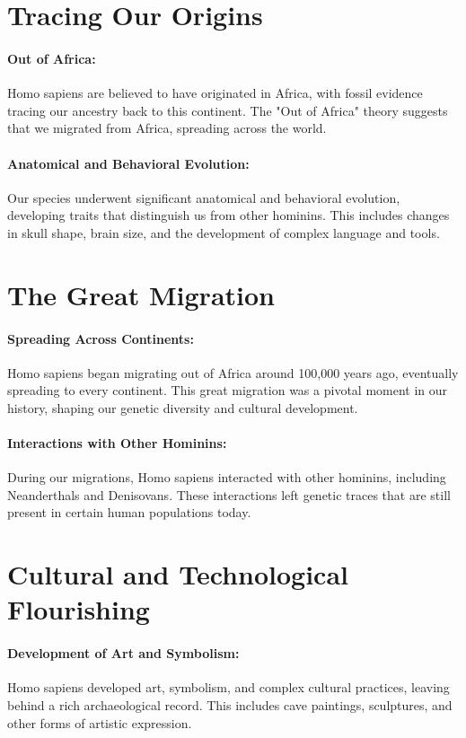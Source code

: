 \documentclass[a4paper,12pt]{book}
\begin{document}
\section*{Tracing Our Origins}

\paragraph{Out of Africa:}
Homo sapiens are believed to have originated in Africa, with fossil evidence tracing our ancestry back to this continent. The "Out of Africa" theory suggests that we migrated from Africa, spreading across the world.

\paragraph{Anatomical and Behavioral Evolution:}
Our species underwent significant anatomical and behavioral evolution, developing traits that distinguish us from other hominins. This includes changes in skull shape, brain size, and the development of complex language and tools.

\section*{The Great Migration}

\paragraph{Spreading Across Continents:}
Homo sapiens began migrating out of Africa around 100,000 years ago, eventually spreading to every continent. This great migration was a pivotal moment in our history, shaping our genetic diversity and cultural development.

\paragraph{Interactions with Other Hominins:}
During our migrations, Homo sapiens interacted with other hominins, including Neanderthals and Denisovans. These interactions left genetic traces that are still present in certain human populations today.

\section*{Cultural and Technological Flourishing}

\paragraph{Development of Art and Symbolism:}
Homo sapiens developed art, symbolism, and complex cultural practices, leaving behind a rich archaeological record. This includes cave paintings, sculptures, and other forms of artistic expression.
\end{document}
